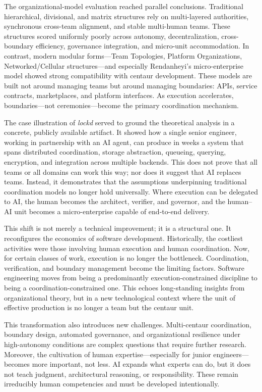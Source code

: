 \documentclass[11pt, a4paper, twocolumn]{article} %
\begin{document}
The organizational-model evaluation reached parallel conclusions. Traditional
hierarchical, divisional, and matrix structures rely on multi-layered
authorities, synchronous cross-team alignment, and stable multi-human teams.
These structures scored uniformly poorly across autonomy, decentralization,
cross-boundary efficiency, governance integration, and micro-unit
accommodation. In contrast, modern modular forms---Team Topologies, Platform
Organizations, Networked/Cellular structures---and especially Rendanheyi’s
micro-enterprise model showed strong compatibility with centaur development.
These models are built not around managing teams but around managing boundaries:
APIs, service contracts, marketplaces, and platform interfaces. As execution
accelerates, boundaries---not ceremonies---become the primary coordination
mechanism.

The case illustration of \textit{lockd} served to ground the theoretical
analysis in a concrete, publicly available artifact. It showed how a single
senior engineer, working in partnership with an AI agent, can produce in weeks a
system that spans distributed coordination, storage abstraction, queueing,
querying, encryption, and integration across multiple backends. This does not
prove that all teams or all domains can work this way; nor does it suggest that
AI replaces teams. Instead, it demonstrates that the assumptions underpinning
traditional coordination models no longer hold universally. Where execution can
be delegated to AI, the human becomes the architect, verifier, and governor, and
the human–AI unit becomes a micro-enterprise capable of end-to-end delivery.

This shift is not merely a technical improvement; it is a structural one. It
reconfigures the economics of software development. Historically, the costliest
activities were those involving human execution and human coordination. Now, for
certain classes of work, execution is no longer the bottleneck. Coordination,
verification, and boundary management become the limiting factors. Software
engineering moves from being a predominantly execution-constrained discipline to
being a coordination-constrained one. This echoes long-standing insights from
organizational theory, but in a new technological context where the unit of
effective production is no longer a team but the centaur unit.

This transformation also introduces new challenges. Multi-centaur coordination,
boundary design, automated governance, and organizational resilience under
high-autonomy conditions are complex questions that require further research.
Moreover, the cultivation of human expertise---especially for junior
engineers---becomes more important, not less. AI expands what experts can do, but
it does not teach judgment, architectural reasoning, or responsibility. These
remain irreducibly human competencies and must be developed intentionally.
\end{document}
